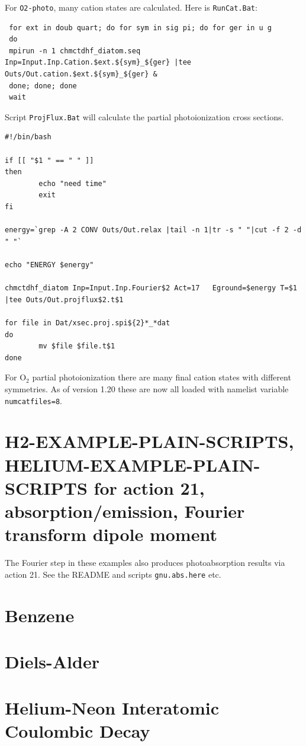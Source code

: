 \documentclass[10pt,leqno, oneside]{book}
\begin{document}
For \verb#O2-photo#, many cation states are calculated.  Here is \verb#RunCat.Bat#:

{\footnotesize
\begin{verbatim}
 for ext in doub quart; do for sym in sig pi; do for ger in u g
 do 
 mpirun -n 1 chmctdhf_diatom.seq Inp=Input.Inp.Cation.$ext.${sym}_${ger} |tee Outs/Out.cation.$ext.${sym}_${ger} & 
 done; done; done
 wait
\end{verbatim}
}
 
Script \verb#ProjFlux.Bat# will calculate the partial photoionization cross sections.

{\footnotesize
\begin{verbatim}
#!/bin/bash

if [[ "$1 " == " " ]]
then
        echo "need time"
        exit
fi

energy=`grep -A 2 CONV Outs/Out.relax |tail -n 1|tr -s " "|cut -f 2 -d " "`

echo "ENERGY $energy"

chmctdhf_diatom Inp=Input.Inp.Fourier$2 Act=17   Eground=$energy T=$1 |tee Outs/Out.projflux$2.t$1

for file in Dat/xsec.proj.spi${2}*_*dat
do
        mv $file $file.t$1
done
\end{verbatim}
}
For O$_2$ partial photoionization there are many final cation states with different symmetries.  
As of version 1.20 these are now all loaded with namelist variable \verb#numcatfiles=8#.

\section{H2-EXAMPLE-PLAIN-SCRIPTS, HELIUM-EXAMPLE-PLAIN-SCRIPTS for action 21, absorption/emission, Fourier transform dipole moment}

The Fourier step in these examples also produces photoabsorption results via action 21.  See the README and scripts \verb#gnu.abs.here# etc.


\section{Benzene}

\section{Diels-Alder}

\section{Helium-Neon Interatomic Coulombic Decay}
\end{document}
